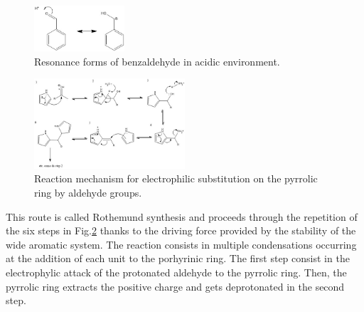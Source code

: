 \documentclass[twoside,twocolumn,9pt]{article}
\begin{document}
\begin{figure}
	\centering
	\includegraphics[width=0.3\textwidth]{resonance-benzaldehyde}
	\caption{Resonance forms of benzaldehyde in acidic environment.}
	\label{res-benz}
\end{figure}
\begin{figure}
	\centering
	\includegraphics[width=0.5\textwidth]{mechanism}
	\caption{Reaction mechanism for electrophilic substitution on the pyrrolic ring by aldehyde groups.}
	\label{mechanism}
\end{figure}
This route is called Rothemund synthesis and proceeds through the repetition of the six steps in Fig.\ref{mechanism} thanks to the driving force provided by the stability of the wide aromatic system.
The reaction consists in multiple condensations occurring at the addition of each unit to the porhyrinic ring.
The first step consist in the electrophylic attack of the protonated aldehyde to the pyrrolic ring.
Then, the pyrrolic ring extracts the positive charge and gets deprotonated in the second step.
\end{document}
